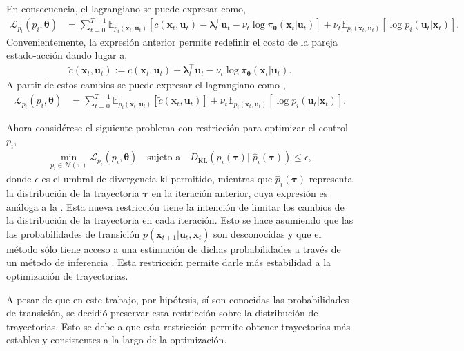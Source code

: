 En consecuencia, el lagrangiano se puede expresar como,
\begin{align}
    \mathcal{L}_{p_i}(p_i, \bm\theta) &= \sum_{t=0}^{T-1}\mathbb{E}_{p_i(\mathbf{x}_t, \mathbf{u}_t)}\left[c(\mathbf{x}_t, \mathbf{u}_t)-\bm{\lambda}_t^{\top}\mathbf{u}_t-\nu_t \log \pi_{\bm\theta}(\mathbf{x}_t|\mathbf{u}_t)
    \right] + \nu_t \mathbb{E}_{p_i(\mathbf{x}_t, \mathbf{u}_t)}[\log p_i(\mathbf{u}_t|\mathbf{x}_t)].
\end{align}
Convenientemente, la expresión anterior permite redefinir el costo de la pareja estado-acción dando lugar a, 
\begin{align}
    \tilde{c}(\mathbf{x}_t, \mathbf{u}_t):=  c(\mathbf{x}_t, \mathbf{u}_t)-\bm{\lambda}_t^{\top}\mathbf{u}_t-\nu_t \log \pi_{\bm\theta}(\mathbf{x}_t|\mathbf{u}_t).
\end{align}
A partir de estos cambios se puede expresar el lagrangiano como \cite{Schneider2018}, 
\begin{align}
     \mathcal{L}_{p_i}(p_i, \bm\theta) &= \sum_{t=0}^{T-1}\mathbb{E}_{p_i(\mathbf{x}_t, \mathbf{u}_t)}[\tilde{c}(\mathbf{x}_t, \mathbf{u}_t)] + \nu_{t} \mathbb{E}_{p_i(\mathbf{x}_t, \mathbf{u}_t)}[\log p_i(\mathbf{u}_t |\mathbf{x}_t)].
\end{align}

Ahora considérese el siguiente problema con restricción para optimizar el control $p_i$,
\begin{align}\label{local_traj_opt}
    \min_{p_i \in \mathcal{N}(\bm\tau)}\mathcal{L}_{p_i}(p_i, \bm\theta) \quad \text{sujeto a}\quad D_{\text{KL}}(p_i(\bm\tau)||\hat{p}_i(\bm\tau))\leq \epsilon, 
\end{align}
donde $\epsilon$ es el umbral de divergencia \acrshort{kl} permitido, mientras que $\hat{p}_i(\bm \tau)$ representa la distribución de la trayectoria $\bm\tau$ en la iteración anterior, cuya expresión es análoga a la . Esta nueva restricción tiene la intención de limitar los cambios de la distribución de la trayectoria en cada iteración. Esto se hace asumiendo que las las probabilidades de transición $p(\mathbf{x}_{t+1}|\mathbf{u}_t, \mathbf{x}_t)$ son desconocidas y que el método sólo tiene acceso a una estimación de dichas probabilidades a través de un método de inferencia \cite{levine2017}. Esta restricción permite darle más estabilidad a la optimización de trayectorias.

A pesar de que en este trabajo, por hipótesis, sí son conocidas las probabilidades de transición, se decidió preservar esta restricción sobre la distribución de trayectorias. Esto se debe a que esta restricción permite obtener trayectorias más estables y consistentes a la largo de la optimización.

